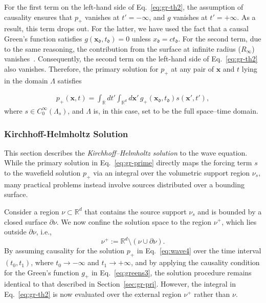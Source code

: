 \documentclass[11pt,reqno]{amsart}
\theoremstyle{remark}
\theoremstyle{italic_lemma}
\newcommand{\bx}{\boldsymbol{x}}
\newcommand{\fd}{\mathfrak{d}}
\begin{document}
For the first term on the left-hand side of Eq.~\eqref{eq:gr-th2}, the assumption of causality ensures that $p_+$ vanishes at $t'= -\infty$, and $g$ vanishes at $t' = +\infty$. As a result, this term drops out. For the latter, we have used the fact that a causal Green's function satisfies $g(\bx_{\fd}, t_{\fd}) = 0$ unless $x_{\fd} = c t_{\fd}$. For the second term, due to the same reasoning, the contribution from the surface at infinite radius (\( R_\infty \)) vanishes~\cite{Devaney}. Consequently, the second term on the left-hand side of Eq.~\eqref{eq:gr-th2} also vanishes.
\noindent
Therefore, the primary solution for $p_+$ at any pair of $\bx$ and $t$ lying in the domain $\Lambda$ satisfies

\begin{align} \label{eq:gr-prime}
    p_+(\bx, t) = \int_{\mathbb{R}} dt' \int_{\mathbb{R}^d} d\bx' \, g_+(\bx_{\fd}, t_{\fd}) s(\bx', t'),
\end{align}
where $s \in C_0^{\infty}(\Lambda_s ) $, and $\Lambda$ is, in this case, set to be the full space--time domain.


\subsubsection{Kirchhoff-Helmholtz Solution} \label{sec:gr-kh}
This section describes the \textit{Kirchhoff--Helmholtz solution} to the wave equation. While the primary solution in Eq.~\eqref{eq:gr-prime} directly maps the forcing term $s$ to the wavefield solution $p_+$ via an integral over the volumetric support region $\nu_s$, many practical problems instead involve sources distributed over a bounding surface.


Consider a region \( \nu \subset \mathbb{R}^d \) that contains the source support \( \nu_s \) and is bounded by a closed surface \( \partial \nu \). We now confine the solution space to the region \( \nu^+ \), which lies outside \( \partial \nu \), i.e., 
\[
\nu^+ := \mathbb{R}^d \setminus \left( \nu \cup \partial \nu \right).
\]
By assuming causality for the solution \( p_+ \) in Eq.~\eqref{eq:wave4} over the time interval \( (t_0, t_1) \), where \( t_0 \to -\infty \) and \( t_1 \to +\infty \), and by applying the causality condition for the Green's function \( g_+ \) in Eq.~\eqref{eq:greens3}, the solution procedure remains identical to that described in Section~\ref{sec:gr-pri}. However, the integral in Eq.~\eqref{eq:gr-th2} is now evaluated over the external region \( \nu^+ \) rather than \( \nu \).
\end{document}
